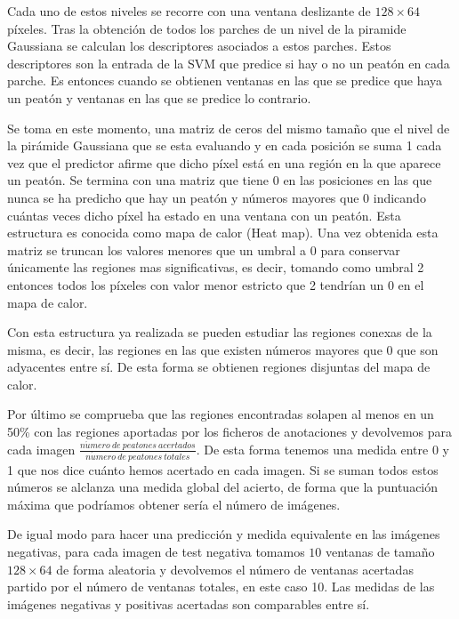 \documentclass[a4paper,12pt]{article}
\begin{document}
Cada uno de estos niveles se recorre con una ventana deslizante de $128\times 64$ píxeles. Tras la obtención de todos los parches de un nivel de la piramide Gaussiana se calculan los descriptores asociados a estos parches. Estos descriptores son la entrada de la SVM que predice si hay o no un peatón en cada parche. Es entonces cuando se obtienen ventanas en las que se predice que haya un peatón y ventanas en las que se predice lo contrario.

Se toma en este momento, una matriz de ceros del mismo tamaño que el nivel de la pirámide Gaussiana que se esta evaluando y en cada posición se suma 1 cada vez que el predictor afirme que dicho píxel está en una región en la que aparece un peatón. Se termina con una matriz que tiene 0 en las posiciones en las que nunca se ha predicho que hay un peatón y números mayores que 0 indicando cuántas veces dicho píxel ha estado en una ventana con un peatón. Esta estructura es conocida como mapa de calor (Heat map). Una vez obtenida esta matriz se truncan los valores menores que un umbral a 0 para conservar únicamente las regiones mas significativas, es decir, tomando como umbral 2 entonces todos los píxeles con valor menor estricto que 2 tendrían un 0 en el mapa de calor.

Con esta estructura ya realizada se pueden estudiar las regiones conexas de la misma, es decir, las regiones en las que existen números mayores que 0 que son adyacentes entre sí. De esta forma se obtienen regiones disjuntas del mapa de calor. 



Por último se comprueba que las regiones encontradas solapen al menos en un 50\% con las regiones aportadas por los ficheros de anotaciones y devolvemos para cada imagen $\frac{n\acute{u}mero \ de \ peatones \ acertados}{n\acute{u}mero \ de \ peatones \ totales}$. De esta forma tenemos una medida entre 0 y 1 que nos dice cuánto hemos acertado en cada imagen. Si se suman todos estos números se alclanza una medida global del acierto, de forma que la puntuación máxima que podríamos obtener sería el número de imágenes.

De igual modo para hacer una predicción y medida equivalente en las imágenes negativas, para cada imagen de test negativa tomamos $10$ ventanas de tamaño $128\times 64$ de forma aleatoria y devolvemos el número de ventanas acertadas partido por el número de ventanas totales, en este caso 10. Las medidas de las imágenes negativas y positivas acertadas son comparables entre sí.
\end{document}

